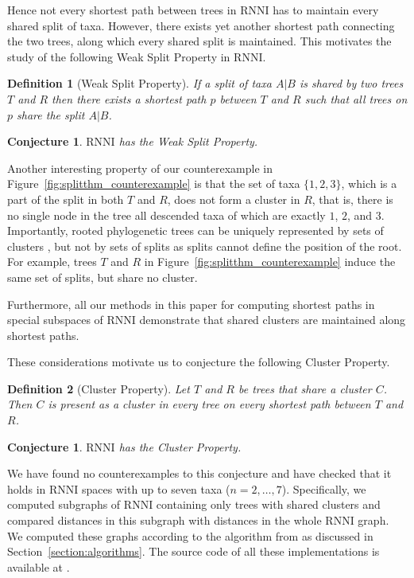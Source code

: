 \documentclass{amsart}
\newcommand{\rnni}{\mathrm{RNNI}}
\newtheorem*{definition}{Definition}
\newtheorem{conjecture}[theorem]{Conjecture}
\begin{document}
Hence not every shortest path between trees in $\rnni$ has to maintain every shared split of taxa.
However, there exists yet another shortest path connecting the two trees, along which every shared split is maintained.
This motivates the study of the following Weak Split Property in $\rnni$.

\begin{definition}[Weak Split Property]
If a split of taxa $A | B$ is shared by two trees $T$ and $R$ then there exists a shortest path $p$ between $T$ and $R$ such that all trees on $p$ share the split $A | B$.
\end{definition}

\begin{conjecture}
\label{conjecture:weak_split_theorem}
$\rnni$ has the Weak Split Property.
\end{conjecture}

Another interesting property of our counterexample in Figure~\ref{fig:splitthm_counterexample} is that the set of taxa $\{1, 2, 3\}$, which is a part of the split in both $T$ and $R$, does not form a cluster in $R$, that is, there is no single node in the tree all descended taxa of which are exactly $1$, $2$, and $3$.
Importantly, rooted phylogenetic trees can be uniquely represented by sets of clusters \autocite{Steel2016-ye}, but not by sets of splits as splits cannot define the position of the root.
For example, trees $T$ and $R$ in Figure~\ref{fig:splitthm_counterexample} induce the same set of splits, but share no cluster.

Furthermore, all our methods in this paper for computing shortest paths in special subspaces of $\rnni$ demonstrate that shared clusters are maintained along shortest paths.

These considerations motivate us to conjecture the following Cluster Property.

\begin{definition}[Cluster Property]
Let $T$ and $R$ be trees that share a cluster $C$.
Then $C$ is present as a cluster in every tree on every shortest path between $T$ and $R$.
\end{definition}

\begin{conjecture}
\label{conjecture:cluster_theorem}
$\rnni$ has the Cluster Property.
\end{conjecture}

We have found no counterexamples to this conjecture and have checked that it holds in $\rnni$ spaces with up to seven taxa ($n = 2, \ldots, 7$).
Specifically, we computed subgraphs of $\rnni$ containing only trees with shared clusters and compared distances in this subgraph with distances in the whole $\rnni$ graph.
We computed these graphs according to the algorithm from \autocite{Gavryushkin2018-ol} as discussed in Section~\ref{section:algorithms}.
The source code of all these implementations is available at \autocite{Collienne2019}.
\end{document}
